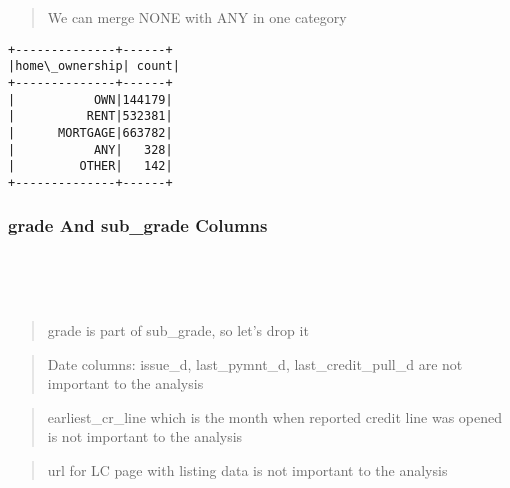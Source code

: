 \documentclass[11pt]{article}
\begin{document}
    \begin{quote}
We can merge NONE with ANY in one category
\end{quote}

    \begin{Verbatim}[commandchars=\\\{\}]
+--------------+------+
|home\_ownership| count|
+--------------+------+
|           OWN|144179|
|          RENT|532381|
|      MORTGAGE|663782|
|           ANY|   328|
|         OTHER|   142|
+--------------+------+

    \end{Verbatim}

    \hypertarget{grade-and-sub_grade-columns}{%
\subsubsection{grade And sub\_grade
Columns}\label{grade-and-sub_grade-columns}}

    \begin{center}
    \end{center}
    { \hspace*{\fill} \\}
    
    \begin{center}
    \end{center}
    { \hspace*{\fill} \\}
    
    \begin{quote}
grade is part of sub\_grade, so let's drop it
\end{quote}

\begin{quote}
Date columns: issue\_d, last\_pymnt\_d, last\_credit\_pull\_d are not
important to the analysis
\end{quote}

\begin{quote}
earliest\_cr\_line which is the month when reported credit line was
opened is not important to the analysis
\end{quote}

\begin{quote}
url for LC page with listing data is not important to the analysis
\end{quote}
\end{document}
